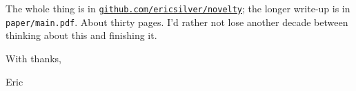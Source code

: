 \documentclass[11pt]{article}
\begin{document}
The whole thing is in
\href{https://github.com/ericsilver/novelty}{\texttt{github.com/ericsilver/novelty}};
the longer write-up is in \texttt{paper/main.pdf}. About thirty
pages. I'd rather not lose another decade between thinking about
this and finishing it.

\medskip
With thanks,

\medskip
\noindent Eric
\end{document}
